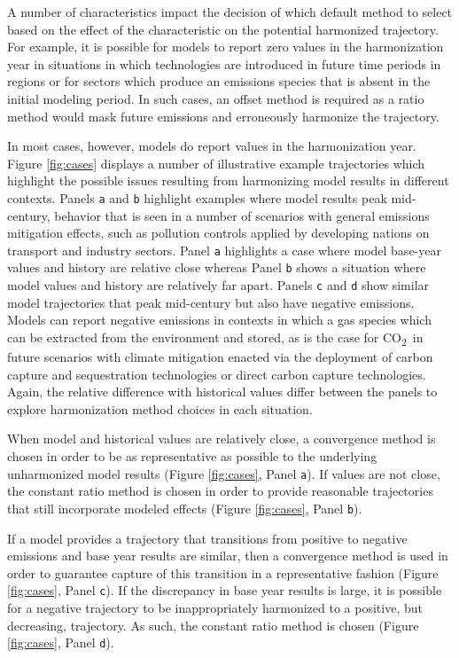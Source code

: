 \documentclass[review]{elsarticle}
\newcommand{\code}[1]{\lstinline[basicstyle=\ttfamily\color{black}]|#1|}
\newcommand{\cotwo}{CO\textsubscript{2}~}
\begin{document}
A number of characteristics impact the decision of which default method to
select based on the effect of the characteristic on the potential harmonized
trajectory. For example, it is possible for models to report zero values in the
harmonization year in situations in which technologies are introduced in future
time periods in regions or for sectors which produce an emissions species that
is absent in the initial modeling period. In such cases, an offset method is
required as a ratio method would mask future emissions and erroneously harmonize
the trajectory. 

In most cases, however, models do report values in the harmonization
year. Figure \ref{fig:cases} displays a number of illustrative example
trajectories which highlight the possible issues resulting from harmonizing
model results in different contexts. Panels \code{a} and \code{b} highlight
examples where model results peak mid-century, behavior that is seen in a number
of scenarios with general emissions mitigation effects, such as pollution
controls applied by developing nations on transport and industry sectors. Panel
\code{a} highlights a case where model base-year values and history are relative
close whereas Panel \code{b} shows a situation where model values and history
are relatively far apart. Panels \code{c} and \code{d} show similar model
trajectories that peak mid-century but also have negative emissions. Models can
report negative emissions in contexts in which a gas species which can be
extracted from the environment and stored, as is the case for \cotwo in future
scenarios with climate mitigation enacted via the deployment of carbon capture
and sequestration technologies or direct carbon capture technologies. Again, the
relative difference with historical values differ between the panels to explore
harmonization method choices in each situation.

When model and historical values are relatively close, a convergence method is
chosen in order to be as representative as possible to the underlying
unharmonized model results (Figure \ref{fig:cases}, Panel \code{a}). If values
are not close, the constant ratio method is chosen in order to provide
reasonable trajectories that still incorporate modeled effects (Figure
\ref{fig:cases}, Panel \code{b}).

If a model provides a trajectory that transitions from positive to negative
emissions and base year results are similar, then a convergence method is used
in order to guarantee capture of this transition in a representative fashion
(Figure \ref{fig:cases}, Panel \code{c}). If the discrepancy in base year
results is large, it is possible for a negative trajectory to be inappropriately
harmonized to a positive, but decreasing, trajectory. As such, the constant
ratio method is chosen (Figure \ref{fig:cases}, Panel \code{d}).
\end{document}
